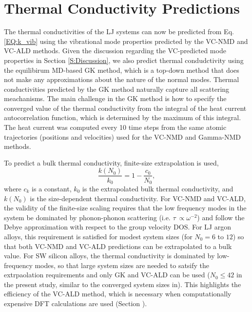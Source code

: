 \documentclass[aps,prb,onecolumn,preprint,superscriptaddress,amsmath,amssymb,floatfix]{revtex4}
\begin{document}

\section{\label{S:Thermal Conductivity}Thermal Conductivity Predictions}

The thermal conductivities of the LJ systems can now be predicted from 
Eq. \eqref{EQ:k_vib} using the vibrational mode properties 
predicted by the VC-NMD and VC-ALD 
methods.  Given the discussion regarding the VC-predicted 
mode properties in Section \ref{S:Discussion}, 
we also predict thermal condudctivity using the equilibirum 
MD-based GK method, which 
is a top-down method that does not make any approximations about the 
nature of the normal modes. 
Thermal conductivities predicted by the GK method 
naturally capture all scattering 
meachanisms.
\cite{skye_thermal_2008,landry_complex_2008,landry_effect_2009} 
The main challenge in the GK method is how to specify the converged 
value of the thermal conductivity from the integral of the 
heat current autocorrelation function, 
which is determined by the maximum of this integral. The heat current 
was computed every 10 time steps from the same atomic trajectories 
(positions and velocities) used for the VC-NMD and Gamma-NMD methods.

To predict a bulk thermal conductivity, finite-size extrapolation is 
used, 
\begin{equation}\label{EQ:Dynamical}
\frac{k(N_0)}{k_0} = 1 - \frac{c_0}{N_0},
\end{equation}
where $c_k$ is a constant, $k_0$ is the 
extrapolated bulk thermal conductivity, and 
$k(N_0)$ is the size-dependent thermal conductivity.
\cite{shiomi_thermal_2011} 
For VC-NMD and VC-ALD, the validity of the finite-size scaling 
requires that the low frequency modes in the system be dominated by 
phonon-phonon scattering (i.e. $\tau\ \propto \omega^{-2}$) and  
follow the Debye approximation 
with respect to the group velocity DOS.
\cite{shiomi_thermal_2011,esfarjani_heat_2011} For LJ 
argon alloys, this requirement is satisfied for modest system sizes 
(for $N_0 = 6$ to $12$) so that both VC-NMD and VC-ALD predictions 
can be extrapolated to a bulk value. 
For SW silicon alloys, the thermal conductivity is dominated by 
low-frequency modes, so that large system sizes are needed to satsify 
the extrpaolation requirements and only GK and VC-ALD can be used 
($N_0 \le 42$ in the present study, 
similar to the converged system sizes in\cite{he_lattice_2012}). This 
highlights the efficiency of the VC-ALD method, which is 
necessary when computationally expensive 
DFT calculations are used (Section ).
\cite{esfarjani_method_2008,garg_role_2011,tian_phonon_2012,
lindsay_thermal_2012,esfarjani_heat_2011,chaput_phonon-phonon_2011}
\end{document}

